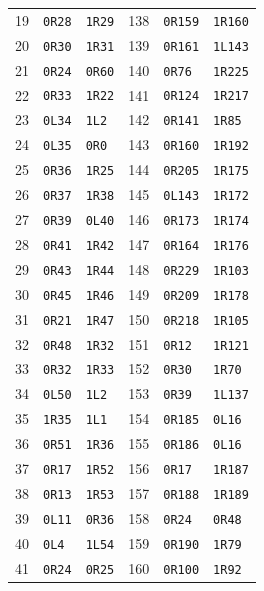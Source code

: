 \begin{longtable}{rll@{\qquad}rll}
19 & \texttt{0R28} & \texttt{1R29} & 138 & \texttt{0R159} & \texttt{1R160}\\
20 & \texttt{0R30} & \texttt{1R31} & 139 & \texttt{0R161} & \texttt{1L143}\\
21 & \texttt{0R24} & \texttt{0R60} & 140 & \texttt{0R76} & \texttt{1R225}\\
22 & \texttt{0R33} & \texttt{1R22} & 141 & \texttt{0R124} & \texttt{1R217}\\
23 & \texttt{0L34} & \texttt{1L2} & 142 & \texttt{0R141} & \texttt{1R85}\\
24 & \texttt{0L35} & \texttt{0R0} & 143 & \texttt{0R160} & \texttt{1R192}\\
25 & \texttt{0R36} & \texttt{1R25} & 144 & \texttt{0R205} & \texttt{1R175}\\
26 & \texttt{0R37} & \texttt{1R38} & 145 & \texttt{0L143} & \texttt{1R172}\\
27 & \texttt{0R39} & \texttt{0L40} & 146 & \texttt{0R173} & \texttt{1R174}\\
28 & \texttt{0R41} & \texttt{1R42} & 147 & \texttt{0R164} & \texttt{1R176}\\
29 & \texttt{0R43} & \texttt{1R44} & 148 & \texttt{0R229} & \texttt{1R103}\\
30 & \texttt{0R45} & \texttt{1R46} & 149 & \texttt{0R209} & \texttt{1R178}\\
31 & \texttt{0R21} & \texttt{1R47} & 150 & \texttt{0R218} & \texttt{1R105}\\
32 & \texttt{0R48} & \texttt{1R32} & 151 & \texttt{0R12} & \texttt{1R121}\\
33 & \texttt{0R32} & \texttt{1R33} & 152 & \texttt{0R30} & \texttt{1R70}\\
34 & \texttt{0L50} & \texttt{1L2} & 153 & \texttt{0R39} & \texttt{1L137}\\
35 & \texttt{1R35} & \texttt{1L1} & 154 & \texttt{0R185} & \texttt{0L16}\\
36 & \texttt{0R51} & \texttt{1R36} & 155 & \texttt{0R186} & \texttt{0L16}\\
37 & \texttt{0R17} & \texttt{1R52} & 156 & \texttt{0R17} & \texttt{1R187}\\
38 & \texttt{0R13} & \texttt{1R53} & 157 & \texttt{0R188} & \texttt{1R189}\\
39 & \texttt{0L11} & \texttt{0R36} & 158 & \texttt{0R24} & \texttt{0R48}\\
40 & \texttt{0L4} & \texttt{1L54} & 159 & \texttt{0R190} & \texttt{1R79}\\
41 & \texttt{0R24} & \texttt{0R25} & 160 & \texttt{0R100} & \texttt{1R92}\\

\end{longtable}
